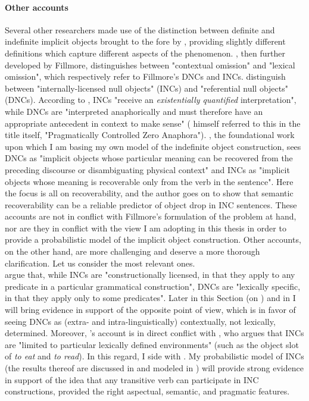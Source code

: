 \paragraph{Other accounts}
Several other researchers made use of the distinction between definite and indefinite implicit objects brought to the fore by \textcite{Fillmore1986}, providing slightly different definitions which capture different aspects of the phenomenon. \textcite{Allerton1975}, then further developed by Fillmore, distinguishes between "contextual omission" and "lexical omission", which respectively refer to Fillmore's DNCs and INCs. \textcite{CumminsRoberge2004} distinguish between "internally-licensed null objects" (INCs) and "referential null objects" (DNCs). According to \textcite[30]{PethoKardos2006}, INCs "receive an \textit{existentially quantified} interpretation", while DNCs are "interpreted anaphorically and must therefore have an appropriate antecedent in context to make sense" (\textcite{Fillmore1986} himself referred to this in the title itself, "Pragmatically Controlled Zero Anaphora"). \textcite[13]{Medina2007}, the foundational work upon which I am basing my own model of the indefinite object construction, sees DNCs as "implicit objects whose particular meaning can be recovered from the preceding discourse or disambiguating physical context" and INCs as "implicit objects whose meaning is recoverable only from the verb in the sentence". Here the focus is all on recoverability, and the author goes on to show that semantic recoverability can be a reliable predictor of object drop in INC sentences. These accounts are not in conflict with Fillmore's formulation of the problem at hand, nor are they in conflict with the view I am adopting in this thesis in order to provide a probabilistic model of the implicit object construction. Other accounts, on the other hand, are more challenging and deserve a more thorough clarification. Let us consider the most relevant ones.\\
\textcite[55]{TonelliDelmonte2011} argue that, while INCs are "constructionally licensed, in that they apply to any predicate in a particular grammatical construction", DNCs are "lexically specific, in that they apply only to some predicates". Later in this Section (on ) and in  I will bring evidence in support of the opposite point of view, which is in favor of seeing DNCs as (extra- and intra-linguistically) contextually, not lexically, determined. Moreover, \textcite{TonelliDelmonte2011}'s account is in direct conflict with \textcite[95]{Fillmore1986}, who argues that INCs are "limited to particular lexically defined environments" (such as the object slot of \textit{to eat} and \textit{to read}). In this regard, I side with \textcite{TonelliDelmonte2011}. My probabilistic model of INCs (the results thereof are discussed in  and modeled in ) will provide strong evidence in support of the idea that any transitive verb can participate in INC constructions, provided the right aspectual, semantic, and pragmatic features.\\
